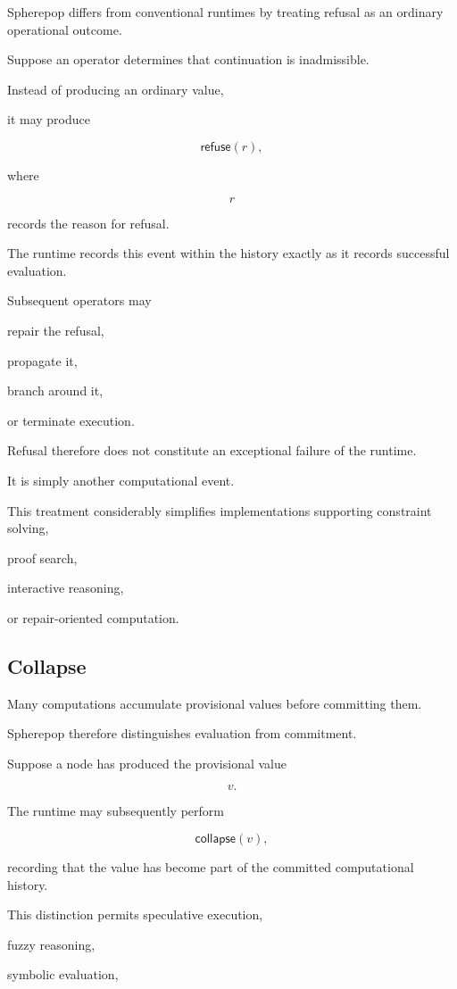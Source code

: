 \documentclass[12pt,oneside]{article}
\newcommand{\Refuse}{\mathsf{refuse}}
\newcommand{\Collapse}{\mathsf{collapse}}
\begin{document}
Spherepop differs from conventional runtimes by treating refusal as an ordinary operational outcome.

Suppose an operator determines that continuation is inadmissible.

Instead of producing an ordinary value,

it may produce

\[
\Refuse(r),
\]

where

\[
r
\]

records the reason for refusal.

The runtime records this event within the history exactly as it records successful evaluation.

Subsequent operators may

repair the refusal,

propagate it,

branch around it,

or terminate execution.

Refusal therefore does not constitute an exceptional failure of the runtime.

It is simply another computational event.

This treatment considerably simplifies implementations supporting constraint solving,

proof search,

interactive reasoning,

or repair-oriented computation.

\subsection{Collapse}

Many computations accumulate provisional values before committing them.

Spherepop therefore distinguishes evaluation from commitment.

Suppose a node has produced the provisional value

\[
v.
\]

The runtime may subsequently perform

\[
\Collapse(v),
\]

recording that the value has become part of the committed computational history.

This distinction permits speculative execution,

fuzzy reasoning,

symbolic evaluation,
\end{document}
